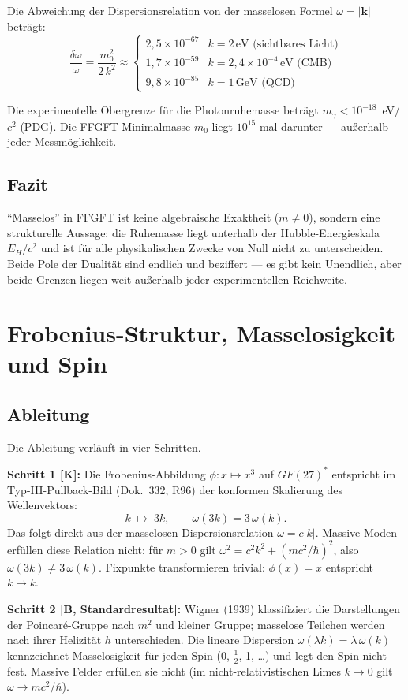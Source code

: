 Die Abweichung der Dispersionsrelation von der masselosen Formel
$\omega=|\mathbf{k}|$ beträgt:
\[
\frac{\delta\omega}{\omega}
= \frac{m_0^2}{2\,k^2}
\approx \begin{cases}
2{,}5\times10^{-67} & k = 2\,\text{eV (sichtbares Licht)}\\
1{,}7\times10^{-59} & k = 2{,}4\times10^{-4}\,\text{eV (CMB)}\\
9{,}8\times10^{-85} & k = 1\,\text{GeV (QCD)}
\end{cases}
\]

Die experimentelle Obergrenze für die Photonruhemasse beträgt
$m_\gamma < 10^{-18}$~eV/$c^2$ (PDG). Die FFGFT-Minimalmasse $m_0$
liegt $10^{15}$ mal darunter --- außerhalb jeder Messmöglichkeit.

\subsection{Fazit}

``Masselos'' in FFGFT ist keine algebraische Exaktheit ($m\neq0$),
sondern eine strukturelle Aussage: die Ruhemasse liegt unterhalb der
Hubble-Energieskala $E_H/c^2$ und ist für alle physikalischen Zwecke
von Null nicht zu unterscheiden. Beide Pole der Dualität sind endlich
und beziffert — es gibt kein Unendlich, aber beide Grenzen liegen weit
außerhalb jeder experimentellen Reichweite.

\section{Frobenius-Struktur, Masselosigkeit und Spin \KM}

\subsection{Ableitung}

Die Ableitung verläuft in vier Schritten.

\textbf{Schritt 1 [K]:} Die Frobenius-Abbildung $\phi: x\mapsto x^3$ auf
$GF(27)^*$ entspricht im Typ-III-Pullback-Bild (Dok.~332, R96) der konformen
Skalierung des Wellenvektors:
\[
k \;\mapsto\; 3k, \qquad \omega(3k) = 3\,\omega(k).
\]
Das folgt direkt aus der masselosen Dispersionsrelation $\omega=c|k|$.
Massive Moden erfüllen diese Relation nicht: für $m>0$ gilt
$\omega^2=c^2k^2+(mc^2/\hbar)^2$, also $\omega(3k)\neq3\,\omega(k)$.
Fixpunkte transformieren trivial: $\phi(x)=x$ entspricht $k\mapsto k$.

\textbf{Schritt 2 [B, Standardresultat]:} Wigner (1939) klassifiziert die
Darstellungen der Poincaré-Gruppe nach $m^2$ und kleiner Gruppe; masselose
Teilchen werden nach ihrer Helizität $h$ unterschieden. Die lineare Dispersion
$\omega(\lambda k)=\lambda\,\omega(k)$ kennzeichnet Masselosigkeit für jeden
Spin (0, $\tfrac12$, 1, \ldots) und legt den Spin nicht fest. Massive Felder
erfüllen sie nicht (im nicht-relativistischen Limes $k\to0$ gilt
$\omega\to mc^2/\hbar$).

